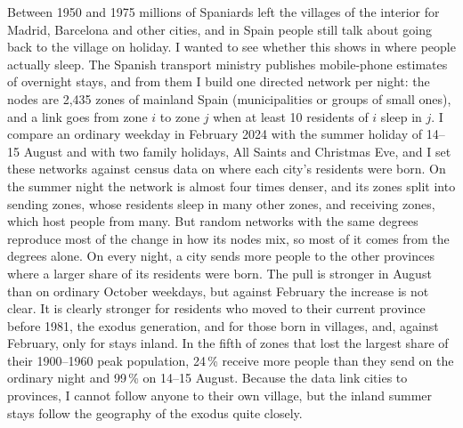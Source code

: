 Between 1950 and 1975 millions of Spaniards left the villages of the interior for Madrid, Barcelona and other cities, and in Spain people still talk about going back to the village on holiday. I wanted to see whether this shows in where people actually sleep. The Spanish transport ministry publishes mobile-phone estimates of overnight stays, and from them I build one directed network per night: the nodes are 2,435 zones of mainland Spain (municipalities or groups of small ones), and a link goes from zone $i$ to zone $j$ when at least 10 residents of $i$ sleep in $j$. I compare an ordinary weekday in February 2024 with the summer holiday of 14--15 August and with two family holidays, All Saints and Christmas Eve, and I set these networks against census data on where each city's residents were born. On the summer night the network is almost four times denser, and its zones split into sending zones, whose residents sleep in many other zones, and receiving zones, which host people from many. But random networks with the same degrees reproduce most of the change in how its nodes mix, so most of it comes from the degrees alone. On every night, a city sends more people to the other provinces where a larger share of its residents were born. The pull is stronger in August than on ordinary October weekdays, but against February the increase is not clear. It is clearly stronger for residents who moved to their current province before 1981, the exodus generation, and for those born in villages, and, against February, only for stays inland. In the fifth of zones that lost the largest share of their 1900--1960 peak population, 24\,\% receive more people than they send on the ordinary night and 99\,\% on 14--15 August. Because the data link cities to provinces, I cannot follow anyone to their own village, but the inland summer stays follow the geography of the exodus quite closely.
